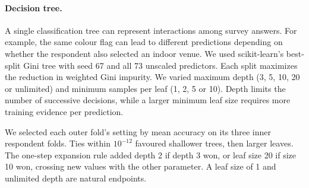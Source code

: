 \paragraph{Decision tree.}
A single classification tree can represent interactions among survey answers. For example,
the same colour flag can lead to different predictions depending on whether the respondent
also selected an indoor venue. We used scikit-learn's best-split Gini tree with seed 67
and all 73 unscaled predictors. Each split maximizes the reduction in weighted Gini impurity.
We varied maximum depth (3, 5, 10, 20 or unlimited) and minimum samples per leaf
(1, 2, 5 or 10). Depth limits the number of successive decisions, while a larger minimum
leaf size requires more training evidence per prediction.

We selected each outer fold's setting by mean accuracy on its three inner respondent folds.
Ties within $10^{-12}$ favoured shallower trees, then larger leaves. The one-step expansion
rule added depth 2 if depth 3 won, or leaf size 20 if size 10 won, crossing new values with
the other parameter. A leaf size of 1 and unlimited depth are natural endpoints.
